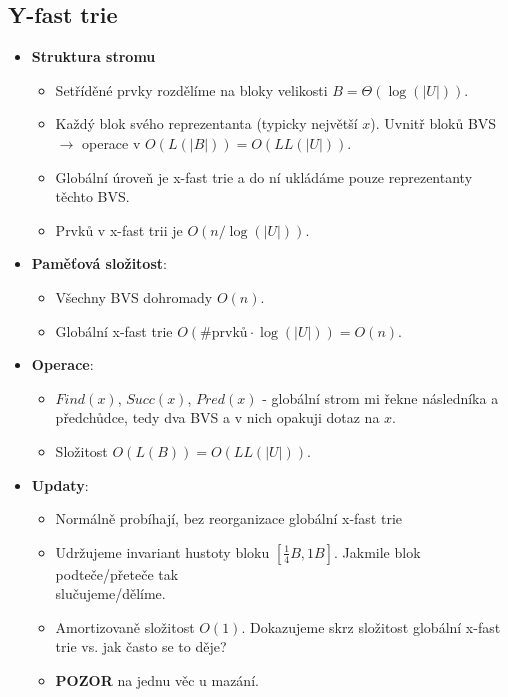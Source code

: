 \documentclass[11pt,a4paper]{article}
\begin{document}
\subsection{Y-fast trie}
    \begin{itemize}
        \item \textbf{Struktura stromu}
        \begin{itemize}
            \item Setříděné prvky rozdělíme na bloky velikosti $B = \Theta(\log (|U|))$.
            \item Každý blok svého reprezentanta (typicky největší $x$). Uvnitř bloků BVS \\ $\rightarrow$ operace v $O(L(|B|)) = O(LL(|U|))$.
            \item Globální úroveň je x-fast trie a do ní ukládáme pouze reprezentanty těchto BVS.
            \item Prvků v x-fast trii je $O(n/\log(|U|))$.
        \end{itemize}
        \item \textbf{Paměťová složitost}:
        \begin{itemize}
            \item Všechny BVS dohromady $O(n)$.
            \item Globální x-fast trie $O(\#\text{prvků} \cdot \log(|U|)) = O(n)$.
        \end{itemize}
        \item \textbf{Operace}:
        \begin{itemize}
            \item $Find(x)$, $Succ(x)$, $Pred(x)$ - globální strom mi řekne následníka a předchůdce, tedy dva BVS a v nich opakuji dotaz na $x$.
            \item Složitost $O(L(B)) = O(LL(|U|))$.
        \end{itemize}
        \item \textbf{Updaty}:
        \begin{itemize}
            \item Normálně probíhají, bez reorganizace globální x-fast trie
            \item Udržujeme invariant hustoty bloku $[\frac{1}{4}B,1B]$. Jakmile blok podteče/přeteče tak \\ slučujeme/dělíme.
            \item Amortizovaně složitost $O(1)$. Dokazujeme skrz složitost globální x-fast trie vs. jak často se to děje?
            \item \textbf{POZOR} na jednu věc u mazání. 
        \end{itemize}
    \end{itemize}
\end{document}
